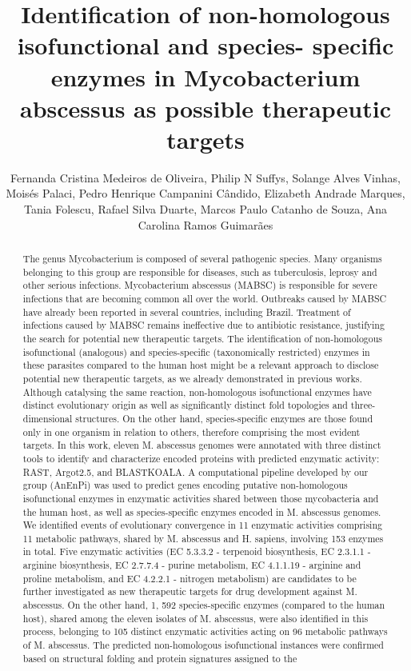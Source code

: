 \documentclass[twoside]{article}
\title{\vspace{-15mm}\fontsize{24pt}{10pt}\selectfont\textbf{ Identification of non-homologous isofunctional and species- specific enzymes in Mycobacterium abscessus as possible therapeutic targets }} %
\author{ Fernanda Cristina Medeiros de Oliveira, Philip N Suffys, Solange Alves Vinhas, Mois\'es Palaci, Pedro Henrique Campanini C\^andido, Elizabeth Andrade Marques, Tania Folescu, Rafael Silva Duarte, Marcos Paulo Catanho de Souza, Ana Carolina Ramos Guimar\~aes }
\affil{ Funda\c{c}\~ao Oswaldo Cruz,  Instituto Oswaldo Cruz,  Laborat\'orio de Gen\'etica Molecular de Microrganismos,  Rio de Janeiro,  Brazil }
\date{}
\begin{document}
  
  
  \maketitle %
  
  
  \thispagestyle{fancy} %
  
  
  \begin{abstract}
  The genus Mycobacterium is composed of several pathogenic species. Many organisms belonging to this group are responsible for diseases,  such as tuberculosis,  leprosy and other serious infections. Mycobacterium abscessus (MABSC) is responsible for severe infections that are becoming common all over the world. Outbreaks caused by MABSC have already been reported in several countries,  including Brazil. Treatment of infections caused by MABSC remains ineffective due to antibiotic resistance,  justifying the search for potential new therapeutic targets. The identification of non-homologous isofunctional (analogous) and species-specific (taxonomically restricted) enzymes in these parasites compared to the human host might be a relevant approach to disclose potential new therapeutic targets,  as we already demonstrated in previous works. Although catalysing the same reaction,  non-homologous isofunctional enzymes have distinct evolutionary origin as well as significantly distinct fold topologies and three-dimensional structures. On the other hand,  species-specific enzymes are those found only in one organism in relation to others,  therefore comprising the most evident targets. In this work,  eleven M. abscessus genomes were annotated with three distinct tools to identify and characterize encoded proteins with predicted enzymatic activity: RAST,  Argot2.5,  and BLASTKOALA. A computational pipeline developed by our group (AnEnPi) was used to predict genes encoding putative non-homologous isofunctional enzymes in enzymatic activities shared between those mycobacteria and the human host,  as well as species-specific enzymes encoded in M. abscessus genomes. We identified events of evolutionary convergence in 11 enzymatic activities comprising 11 metabolic pathways,  shared by M. abscessus and H. sapiens,  involving 153 enzymes in total. Five enzymatic activities (EC 5.3.3.2 - terpenoid biosynthesis,  EC 2.3.1.1 - arginine biosynthesis,  EC 2.7.7.4 - purine metabolism,  EC 4.1.1.19 - arginine and proline metabolism,  and EC 4.2.2.1 - nitrogen metabolism) are candidates to be further investigated as new therapeutic targets for drug development against M. abscessus. On the other hand,  1, 592 species-specific enzymes (compared to the human host),  shared among the eleven isolates of M. abscessus,  were also identified in this process,  belonging to 105 distinct enzymatic activities acting on 96 metabolic pathways of M. abscessus. The predicted non-homologous isofunctional instances were confirmed based on structural folding and protein signatures assigned to the 
\end{abstract}
\end{document}
